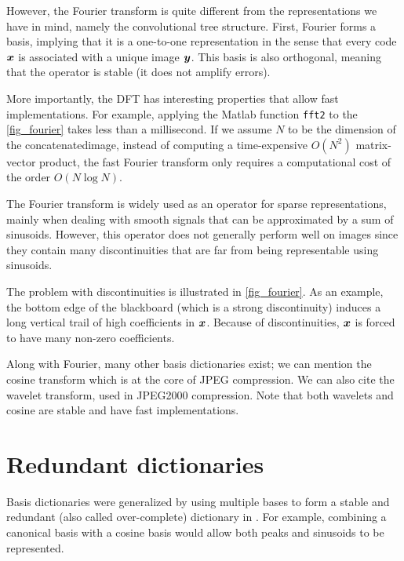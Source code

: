 However, the Fourier transform is quite different from the representations we have in mind, namely the convolutional tree structure. First, Fourier forms a basis, implying that it is a one-to-one representation in the sense that every code $\bm{x}$ is associated with a unique image $\bm{y}$. This basis is also orthogonal, meaning that the operator is stable (it does not amplify errors). 

More importantly, the \ac{DFT} has interesting properties that allow fast implementations. For example, applying the Matlab function \texttt{fft2} to the \cref{fig_fourier} takes less than a millisecond. If we assume $N$ to be the dimension of the concatenated\footnotemark[2] image, instead of computing a time-expensive $O(N^2)$ matrix-vector product, the fast Fourier transform only requires a computational cost of the order $O(N \log N)$.



The Fourier transform is widely used as an operator for sparse representations, mainly when dealing with smooth signals that can be approximated by a sum of sinusoids. However, this operator does not generally perform well on images since they contain many discontinuities that are far from being representable using sinusoids.

The problem with discontinuities is illustrated in \cref{fig_fourier}. As an example, the bottom edge of the blackboard (which is a strong discontinuity) induces a long vertical trail of high coefficients in $\bm{x}$. Because of discontinuities, $\bm{x}$ is forced to have many non-zero coefficients. 

Along with Fourier, many other basis dictionaries exist; we can mention the cosine transform which is at the core of JPEG compression. We can also cite the wavelet transform, used in JPEG2000 compression. Note that both wavelets and cosine are stable and have fast implementations.

\section{Redundant dictionaries}

Basis dictionaries were generalized by using multiple bases to form a stable and redundant (also called over-complete) dictionary in \cite{chen_atomic_2001}. For example, combining a canonical basis with a cosine basis would allow both peaks and sinusoids to be represented.

